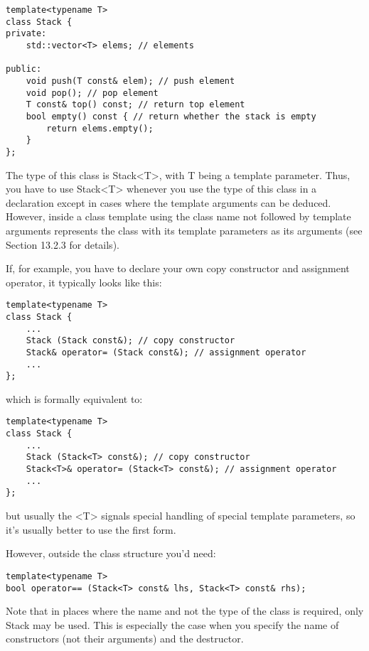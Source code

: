 \begin{lstlisting}[style=styleCXX]
template<typename T>
class Stack {
private:
	std::vector<T> elems; // elements
	
public:
	void push(T const& elem); // push element
	void pop(); // pop element
	T const& top() const; // return top element
	bool empty() const { // return whether the stack is empty
		return elems.empty();
	}
};
\end{lstlisting}

The type of this class is Stack<T>, with T being a template parameter. Thus, you have to use Stack<T> whenever you use the type of this class in a declaration except in cases where the template arguments can be deduced. However, inside a class template using the class name not followed by template arguments represents the class with its template parameters as its arguments (see Section 13.2.3 for details).

If, for example, you have to declare your own copy constructor and assignment operator, it typically looks like this:

\begin{lstlisting}[style=styleCXX]
template<typename T>
class Stack {
	...
	Stack (Stack const&); // copy constructor
	Stack& operator= (Stack const&); // assignment operator
	...
};
\end{lstlisting}

which is formally equivalent to:

\begin{lstlisting}[style=styleCXX]
template<typename T>
class Stack {
	...
	Stack (Stack<T> const&); // copy constructor
	Stack<T>& operator= (Stack<T> const&); // assignment operator
	...
};
\end{lstlisting}

but usually the <T> signals special handling of special template parameters, so it’s usually better to use the first form.

However, outside the class structure you’d need:

\begin{lstlisting}[style=styleCXX]
template<typename T>
bool operator== (Stack<T> const& lhs, Stack<T> const& rhs);
\end{lstlisting}

Note that in places where the name and not the type of the class is required, only Stack may be used. This is especially the case when you specify the name of constructors (not their arguments) and the destructor.

